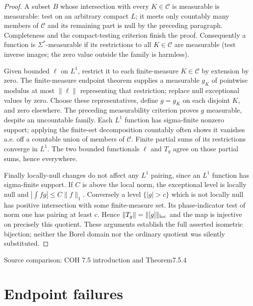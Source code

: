 \documentclass[11pt,oneside,openany]{book}
\theoremstyle{definition}
\theoremstyle{remark}
\newcommand{\source}[1]{\par\begingroup\small\sffamily\color{black!65}Source comparison: #1\par\endgroup}
\begin{document}
\begin{proof}
A subset $B$ whose intersection with every $K\in\mathcal C$ is measurable is measurable: test on an arbitrary compact $L$; it meets only countably many members of $\mathcal C$ and its remaining part is null by the preceding paragraph. Completeness and the compact-testing criterion finish the proof. Consequently a function is $\Sigma^*$-measurable if its restrictions to all $K\in\mathcal C$ are measurable (test inverse images; the zero value outside the family is harmless).

Given bounded $\ell$ on $L^1$, restrict it to each finite-measure $K\in\mathcal C$ by extension by zero. The finite-measure endpoint theorem supplies a measurable $g_K$ of pointwise modulus at most $\|\ell\|$ representing that restriction; replace null exceptional values by zero. Choose these representatives, define $g=g_K$ on each disjoint $K$, and zero elsewhere. The preceding measurability criterion proves $g$ measurable, despite an uncountable family. Each $L^1$ function has sigma-finite nonzero support; applying the finite-set decomposition countably often shows it vanishes a.e. off a countable union of members of $\mathcal C$. Finite partial sums of its restrictions converge in $L^1$. The two bounded functionals $\ell$ and $T_g$ agree on those partial sums, hence everywhere.

Finally locally-null changes do not affect any $L^1$ pairing, since an $L^1$ function has sigma-finite support. If $C$ is above the local norm, the exceptional level is locally null and $|\int fg|\le C\|f\|_1$. Conversely a level $\{|g|>c\}$ which is not locally null has positive intersection with some finite-measure set. Its phase-indicator test of norm one has pairing at least $c$. Hence $\|T_g\|=\|[g]\|_{\rm loc}$ and the map is injective on precisely this quotient. These arguments establish the full asserted isometric bijection; neither the Borel domain nor the ordinary quotient was silently substituted.
\end{proof}
\source{COH 7.5 introduction and Theorem7.5.4}

\section{Endpoint failures}
\end{document}
